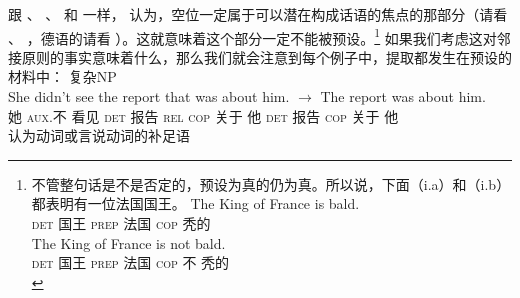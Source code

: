 \noindent
跟 \citet{Erteschik81a}、 \citet{EL79a}、 \citet{Takami88a}
和 \citet{vanValin98a}一样， \citet[\S~7.2]{Goldberg2006a}认为，空位一定属于可以潜在构成话语的焦点的那部分（请看 、 ，德语的请看
 ）。这就意味着这个部分一定不能被预设。\footnote{%
不管整句话是不是否定的，预设为真的仍为真。所以说，下面（i.a）和（i.b）都表明有一位法国国王。
  \eal
  \ex 
  \gll The King of France is bald.\\
  \textsc{det} 国王 \textsc{prep} 法国 \textsc{cop} 秃的\\
  \ex 
  \gll The King of France is not bald.\\
  \textsc{det} 国王 \textsc{prep} 法国 \textsc{cop} 不 秃的\\
  \zllast
}
如果我们考虑这对邻接原则的事实意味着什么，那么我们就会注意到每个例子中，提取都发生在预设的材料中：
\eal
\ex 复杂NP\\
\gll She didn't         see the          report that      was          about him. $\to$ The          report was         about him.\\
     她 \textsc{aux}.不 看见 \textsc{det} 报告 \textsc{rel} \textsc{cop} 关于 他     {}    \textsc{det} 报告   \textsc{cop} 关于 他\\
\ex 认为动词或言说动词的补足语\\
